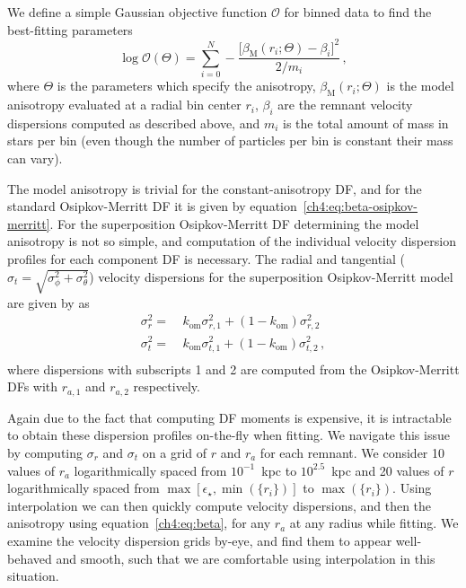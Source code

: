 We define a simple Gaussian objective function $\mathcal{O}$ for binned data to find the best-fitting parameters
\begin{equation}
    \label{ch4:eq:beta-objective-function}
    \log \mathcal{O}(\Theta) = \sum_{i=0}^{N} -\frac{ \big[ \beta_\mathrm{M}(r_{i};\Theta) - \beta_{i} \big]^{2} }{2/m_{i}}\,,
\end{equation}
\noindent where $\Theta$ is the parameters which specify the anisotropy, $\beta_\mathrm{M}(r_{i};\Theta)$ is the model anisotropy evaluated at a radial bin center $r_{i}$, $\beta_{i}$ are the remnant velocity dispersions computed as described above, and $m_{i}$ is the total amount of mass in stars per bin (even though the number of particles per bin is constant their mass can vary). 

The model anisotropy is trivial for the constant-anisotropy DF, and for the standard Osipkov-Merritt DF it is given by equation~\eqref{ch4:eq:beta-osipkov-merritt}. For the superposition Osipkov-Merritt DF determining the model anisotropy is not so simple, and computation of the individual velocity dispersion profiles for each component DF is necessary. The radial and tangential ($\sigma_{t} = \sqrt{\sigma_{\phi}^{2} + \sigma_{\theta}^{2}}$) velocity dispersions for the superposition Osipkov-Merritt model are given by \textcite{merritt85} as
\begin{equation}
\label{ch4:eq:superposition-osipkov-merritt-dispersions}
\begin{split}
    \sigma_{r}^{2} = &\ k_\mathrm{om} \sigma_{r,1}^{2} + (1-k_{\mathrm{om}}) \sigma_{r,2}^{2} \\      
    \sigma_{t}^{2} = &\ k_\mathrm{om} \sigma_{t,1}^{2} + (1-k_{\mathrm{om}}) \sigma_{t,2}^{2}\,, \\      
\end{split}
\end{equation}
where dispersions with subscripts 1 and 2 are computed from the Osipkov-Merritt DFs with $r_{a,1}$ and $r_{a,2}$ respectively.

Again due to the fact that computing DF moments is expensive, it is intractable to obtain these dispersion profiles on-the-fly when fitting. We navigate this issue by computing $\sigma_{r}$ and $\sigma_{t}$ on a grid of $r$ and $r_{a}$ for each remnant. We consider 10 values of $r_{a}$ logarithmically spaced from $10^{-1}$~kpc to $10^{2.5}$~kpc and 20 values of $r$ logarithmically spaced from $\max[\epsilon_{\star},\min(\{ r_{i} \})]$ to $\max(\{ r_{i} \})$. Using interpolation we can then quickly compute velocity dispersions, and then the anisotropy using equation~\eqref{ch4:eq:beta}, for any $r_{a}$ at any radius while fitting. We examine the velocity dispersion grids by-eye, and find them to appear well-behaved and smooth, such that we are comfortable using interpolation in this situation.

